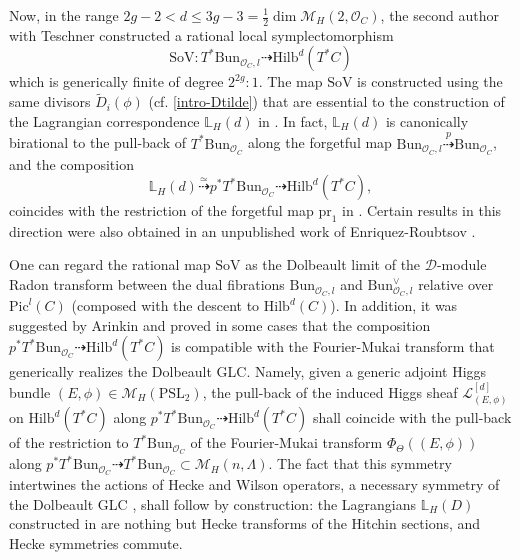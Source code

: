 \documentclass[twoside, 11pt]{article}
\numberwithin{equation}{section}
\theoremstyle{theorem}
\numberwithin{theorem}{section}
\theoremstyle{definition}
\begin{document}
Now, in the range $2g-2 < d \leq 3g-3 = \frac{1}{2}\dim \mathcal{M}_H(2, \mathcal{O}_C)$, the second author with Teschner constructed \cite{DT23} a rational local symplectomorphism 
\begin{equation}\label{intro-SOV-map}
    \mathrm{SoV}: T^\ast \mathrm{Bun}_{\mathcal{O}_C, l} \dashrightarrow \mathrm{Hilb}^d(T^\ast C)
\end{equation}
which is generically finite of degree $2^{2g}:1$.
The map $\mathrm{SoV}$ is constructed using the same divisors $\widetilde{D}_i(\phi)$ (cf. \eqref{intro-Dtilde}) that are essential to the construction of the Lagrangian correspondence $\mathbb{L}_H(d)$ in .
In fact, $\mathbb{L}_H(d)$ is canonically birational to the pull-back of $T^\ast \mathrm{Bun}_{\mathcal{O}_C}$ along the forgetful map 
$\mathrm{Bun}_{\mathcal{O}_C, l} \overset{p}{\dashrightarrow} \mathrm{Bun}_{\mathcal{O}_C}$, 
and the composition 
\[ \mathbb{L}_H(d) \overset{\simeq}{\dashrightarrow} p^\ast T^\ast \mathrm{Bun}_{\mathcal{O}_C} \dashrightarrow \mathrm{Hilb}^d(T^\ast C), \]
coincides with the restriction of the forgetful map $\mathrm{pr}_1$ in .
Certain results in this direction were also obtained in an unpublished work of Enriquez-Roubtsov \cite{volodya-unpublished}.

One can regard the rational map $\mathrm{SoV}$ as the Dolbeault limit of the $\mathcal{D}$-module Radon transform between the dual fibrations $\mathrm{Bun}_{\mathcal{O}_C, l}$ and $\mathrm{Bun}^\vee_{\mathcal{O}_C, l}$ relative over $\mathrm{Pic}^l(C)$ (composed with the descent to $\mathrm{Hilb}^d(C)$).
In addition, it was suggested by Arinkin \cite{Arinkin2012} and proved in some cases \cite{AD} that the composition 
\( p^\ast T^\ast \mathrm{Bun}_{\mathcal{O}_C} \dashrightarrow \mathrm{Hilb}^d(T^\ast C) \)
is compatible with the Fourier-Mukai transform that generically realizes the Dolbeault GLC. 
Namely, given a generic adjoint Higgs bundle $(E, \phi) \in \mathcal{M}_H(\mathrm{PSL}_2)$, the pull-back of the induced Higgs sheaf $\mathcal{L}_{(E,\phi)}^{[d]}$ on $\mathrm{Hilb}^d(T^\ast C)$ along $p^\ast T^\ast \mathrm{Bun}_{\mathcal{O}_C} \dashrightarrow \mathrm{Hilb}^d(T^\ast C)$ shall coincide with the pull-back of the restriction to $T^\ast \mathrm{Bun}_{\mathcal{O}_C}$ of the Fourier-Mukai transform $\Phi_\Theta((E, \phi))$ along $p^\ast T^\ast \mathrm{Bun}_{\mathcal{O}_C} \dashrightarrow T^\ast \mathrm{Bun}_{\mathcal{O}_C} \subset \mathcal{M}_H(n, \Lambda)$.
The fact that this symmetry intertwines the actions of Hecke and Wilson operators, a necessary symmetry of the Dolbeault GLC \cite{Kapustin-Witten06, DonagiPantev2012, HauselICM}, shall follow by construction: the Lagrangians $\mathbb{L}_H(D)$ constructed in  are nothing but Hecke transforms of the Hitchin sections, and Hecke symmetries commute.
\end{document}

